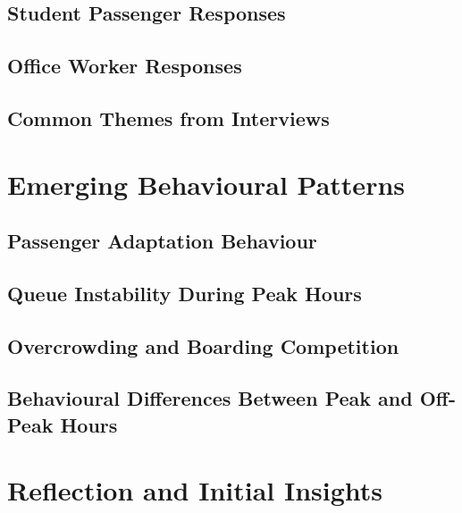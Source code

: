 \documentclass[12pt,a4paper]{report}
\begin{document}
\section{Student Passenger Responses}

\section{Office Worker Responses}

\section{Common Themes from Interviews}


\chapter{Emerging Behavioural Patterns}

\section{Passenger Adaptation Behaviour}

\section{Queue Instability During Peak Hours}

\section{Overcrowding and Boarding Competition}

\section{Behavioural Differences Between Peak and Off-Peak Hours}


\chapter{Reflection and Initial Insights}
\end{document}
